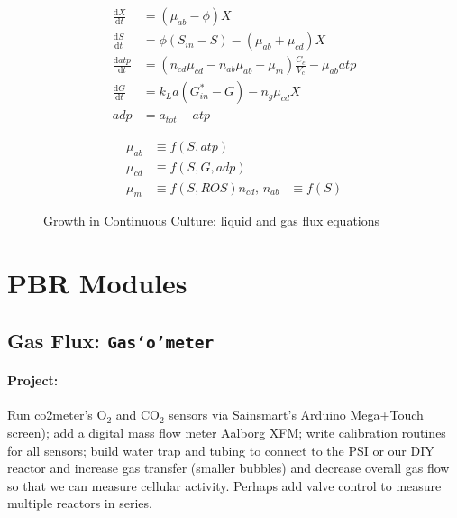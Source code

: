 \documentclass[12pt,a4paper]{scrartcl}
\newcommand{\gasometer}[0]{\texttt{Gas`o'meter}}
\newcommand{\ox}[0]{O$_2$}
\newcommand{\cox}[0]{CO$_2$}
\begin{document}

\begin{figure}
\begin{minipage}{.5\textwidth}
  \begin{equation*}
    \label{eqn:ancat}
    \begin{aligned}
      \frac{\text{d}X}{\text{d}t} &= (\mu_{ab} - \phi) X  \\
      \frac{\text{d}S}{\text{d}t} &= \phi (S_{in} - S)-(\mu_{ab} + \mu_{cd}) X\\  
      \frac{\text{d}atp}{\text{d}t} &= (n_{cd} \mu_{cd} - n_{ab} \mu_{ab} - \mu_{m})\frac{C_c}{V_c} - \mu_{ab} atp\\
      \frac{\text{d}G}{\text{d}t} &= k_La (G_{in}^* - G) - n_{g} \mu_{cd} X\\
      adp & = a_{tot} - atp
    \end{aligned}
  \end{equation*}
\end{minipage}
\begin{minipage}{.5\textwidth}
  \begin{equation*}
    \begin{aligned}
      \mu_{ab} &\equiv f(S,atp)\\
      \mu_{cd} &\equiv f(S,G,adp)\\
      \mu_m &\equiv f(S,ROS)
      n_{cd},\,n_{ab} &\equiv f(S) 
    \end{aligned}
  \end{equation*}
\end{minipage}
\caption{Growth in Continuous Culture: liquid and gas flux equations} 
\end{figure}


\newpage
\section{PBR Modules}
\label{proj}

\subsection{Gas Flux: \gasometer{}}
\label{gas}
\paragraph{Project:} 
Run co2meter's
\href{http://www.co2meter.com/collections/co2-sensors/oxygen-sensors}{\ox{}}
and
\href{http://www.co2meter.com/collections/co2-sensors/products/cozir-5-100-co2-sensor}{\cox{}}
sensors via Sainsmart's
\href{http://www.sainsmart.com/featured-products/sainsmart-mega2560-board-3-5-tft-lcd-module-display-shield-kit-for-atmel-atmega-avr-16au-atmega8u2.html}{Arduino
  Mega+Touch screen}); add a digital mass flow meter
\href{http://www.aalborg.com/index.php/main_page/product_overview/id_product_overview/63}{Aalborg
  XFM}; write calibration routines for all sensors; build water trap
and tubing to connect to the PSI or our DIY reactor and increase gas
transfer (smaller bubbles) and decrease overall gas flow so that we
can measure cellular activity. Perhaps add valve control to measure
multiple reactors in series.
\end{document}

